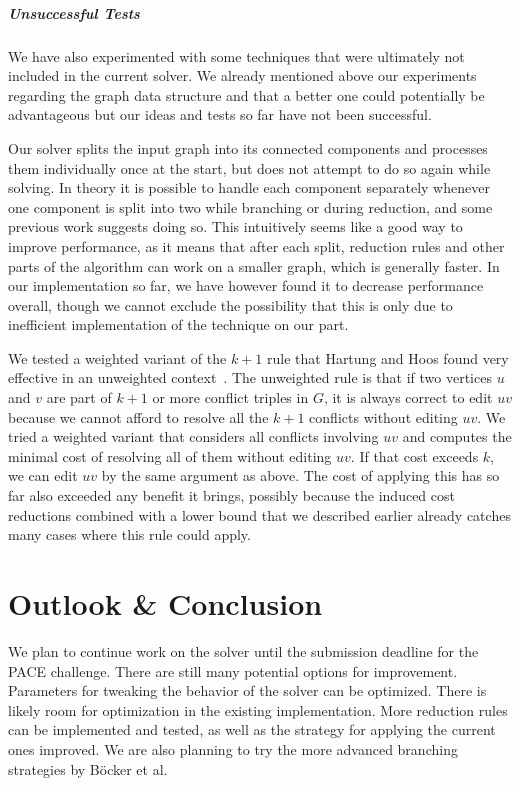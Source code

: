 \documentclass[12pt,oneside,english,parskip=full,headings=small]{scrbook}
\theoremstyle{definition}
\begin{document}
\paragraph{Unsuccessful Tests} We have also experimented with some techniques that were ultimately
not included in the current solver. We already mentioned above our experiments regarding the graph
data structure and that a better one could potentially be advantageous but our ideas and tests so
far have not been successful.

Our solver splits the input graph into its connected components and processes them individually once
at the start, but does not attempt to do so again while solving. In theory it is possible to handle
each component separately whenever one component is split into two while branching or during
reduction, and some previous work suggests doing so. This intuitively seems like a good way to
improve performance, as it means that after each split, reduction rules and other parts of the
algorithm can work on a smaller graph, which is generally faster. In our implementation so far, we
have however found it to decrease performance overall, though we cannot exclude the possibility that
this is only due to inefficient implementation of the technique on our part.

We tested a weighted variant of the $k+1$ rule that Hartung and Hoos found very effective in an
unweighted context~\cite{HartungHoos}. The unweighted rule is that if two vertices $u$ and $v$ are
part of $k + 1$ or more conflict triples in $G$, it is always correct to edit $uv$ because we cannot
afford to resolve all the $k + 1$ conflicts without editing $uv$. We tried a weighted variant that
considers all conflicts involving $uv$ and computes the minimal cost of resolving all of them
without editing $uv$. If that cost exceeds $k$, we can edit $uv$ by the same argument as above. The
cost of applying this has so far also exceeded any benefit it brings, possibly because the induced
cost reductions combined with a lower bound that we described earlier already catches many cases
where this rule could apply.

\chapter{Outlook \& Conclusion}

We plan to continue work on the solver until the submission deadline for the PACE challenge. There
are still many potential options for improvement. Parameters for tweaking the behavior of the
solver can be optimized. There is likely room for optimization in the existing implementation. More
reduction rules can be implemented and tested, as well as the strategy for applying the current ones
improved. We are also planning to try the more advanced branching strategies by Böcker et
al.~\cite{GoldenRatio}
\end{document}
